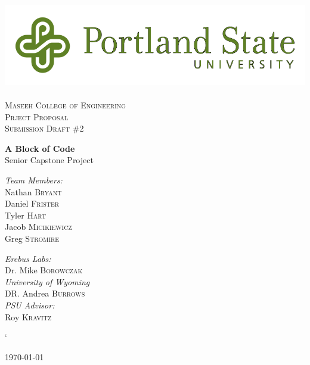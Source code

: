 
\linespread{1.1}
 
\begin{titlepage} 
\begin{center} 
 
\includegraphics[width=.75\textwidth]{./PSU_logo.png}~\\[.5cm] 
 
\textsc{\LARGE \color{PSU} Maseeh College of Engineering}\\[1.5cm] 
 
\textsc{\Large Prject Proposal}\\[0.5cm]
\textsc{\Large Submission Draft \#2}\\[0.5cm]
\vspace{1cm} 
 
{ \huge \bfseries\color{PSU} A Block of Code\\[0.4cm] } 
  \large Senior Capstone Project
 
\vspace{2.5cm} 
 \begin{multicols}{2}
    
\begin{flushleft}
\noindent 
 \large 
\emph{\color{PSU}Team Members:}\\ 
Nathan \textsc{Bryant}\\ 
Daniel \textsc{Frister}\\
Tyler  \textsc{Hart}\\
Jacob   \textsc{Micikiewicz}\\
Greg    \textsc{Stromire}\\
\end{flushleft} 

 \begin{flushleft}
  \large 
 \emph{\color{PSU}Erebus Labs:} \\ 
 Dr. Mike  \textsc{Borowczak}\\ 
 \emph{\color{PSU}University of Wyoming}\\
 DR. Andrea \textsc{Burrows}\\ 
 \emph{\color{PSU}PSU Advisor:}\\ 
 Roy \textsc{Kravitz} 
 \end{flushleft}


 \end{multicols}` 
\vfill 
 
{\large \today} 
 
\end{center} 
\end{titlepage} 
 \tableofcontents

